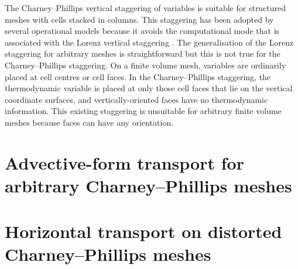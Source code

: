 The Charney--Phillips vertical staggering of variables \citep{charney-phillips1953} is suitable for structured meshes with cells stacked in columns.
This staggering has been adopted by several operational models \citep{davies2005,girard2014,yang2007} because it avoids the computational mode that is associated with the Lorenz vertical staggering \citep{arakawa-konor1996}.
The generalisation of the Lorenz staggering for arbitrary meshes is straightforward \citep{weller-shahrokhi2014} but this is not true for the Charney--Phillips staggering.
On a finite volume mesh, variables are ordinarily placed at cell centres or cell faces. In the Charney--Phillips staggering, the thermodynamic variable is placed at only those cell faces that lie on the vertical coordinate surfaces, and vertically-oriented faces have no thermodynamic information.
This existing staggering is unsuitable for arbitrary finite volume meshes because faces can have any orientation.



\section{Advective-form transport for arbitrary Charney--Phillips meshes}




\section{Horizontal transport on distorted Charney--Phillips meshes}

